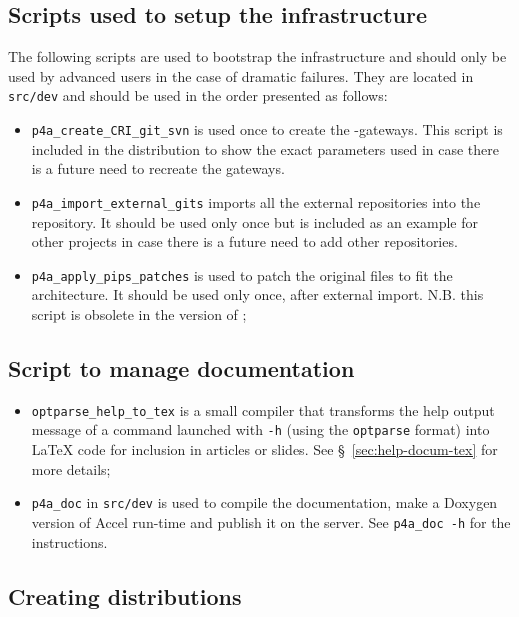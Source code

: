 \documentclass[a4paper]{article}
\begin{document}
\subsection{Scripts used to setup the infrastructure}
\label{sec:scripts-used-setup}

The following scripts are used to
bootstrap the \Apfa infrastructure and should only be used by advanced
users in the case of dramatic failures.
They are located in
\texttt{src/dev} and should be used in the order presented as follows:
\begin{itemize}
\item \verb/p4a_create_CRI_git_svn/ is used once to create the \Apips{}
  \Asvn-\Agit gateways. This script is included in the distribution to
  show the exact parameters used in case there is a future need
  to recreate the gateways.
\item \verb/p4a_import_external_gits/ imports all the external \Agit
  repositories into the \Apfa{} \Agit repository. It should be used only
  once but is included as an example for other projects in case there is
  a future need to add other repositories.
\item \verb/p4a_apply_pips_patches/ is used to patch the original \Apips
  files to fit the \Apfa architecture. It should be used only once, after
  external \Agit import. N.B. this script is obsolete in the
  \Aautotools version of \Apips;
\end{itemize}


\subsection{Script to manage documentation}
\label{sec:script-deal-with}

\begin{itemize}
\item \verb|optparse_help_to_tex| is a small compiler that transforms the
  help output message of a command launched with \texttt{-h} (using
  the \texttt{optparse} format) into La\TeX{} code for inclusion
  in articles or slides. See \S~\ref{sec:help-docum-tex} for more details;
\item \verb|p4a_doc| in \verb|src/dev| is used to compile the \Apfa
  documentation, make a Doxygen version of \Apfa Accel run-time and
  publish it on the server. See \texttt{p4a\_doc -h} for the instructions.
\end{itemize}


\subsection{Creating distributions}
\label{sec:making-distributions}
\end{document}
